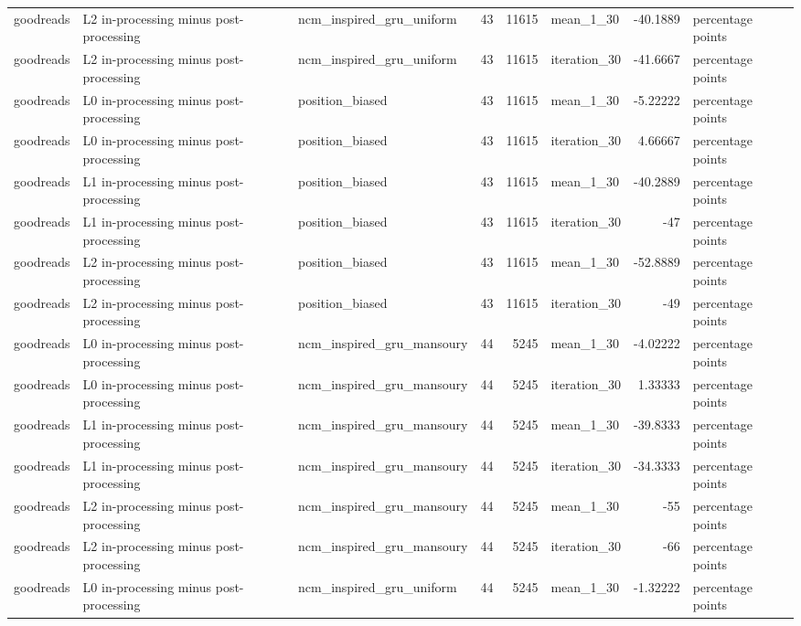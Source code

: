 \begin{table}[htbp!]
\begin{tabular}{lllrrlrl}
goodreads & L2 in-processing minus post-processing & ncm\_inspired\_gru\_uniform & 43 & 11615 & mean\_1\_30 & -40.1889 & percentage points \\
goodreads & L2 in-processing minus post-processing & ncm\_inspired\_gru\_uniform & 43 & 11615 & iteration\_30 & -41.6667 & percentage points \\
goodreads & L0 in-processing minus post-processing & position\_biased & 43 & 11615 & mean\_1\_30 & -5.22222 & percentage points \\
goodreads & L0 in-processing minus post-processing & position\_biased & 43 & 11615 & iteration\_30 & 4.66667 & percentage points \\
goodreads & L1 in-processing minus post-processing & position\_biased & 43 & 11615 & mean\_1\_30 & -40.2889 & percentage points \\
goodreads & L1 in-processing minus post-processing & position\_biased & 43 & 11615 & iteration\_30 & -47 & percentage points \\
goodreads & L2 in-processing minus post-processing & position\_biased & 43 & 11615 & mean\_1\_30 & -52.8889 & percentage points \\
goodreads & L2 in-processing minus post-processing & position\_biased & 43 & 11615 & iteration\_30 & -49 & percentage points \\
goodreads & L0 in-processing minus post-processing & ncm\_inspired\_gru\_mansoury & 44 & 5245 & mean\_1\_30 & -4.02222 & percentage points \\
goodreads & L0 in-processing minus post-processing & ncm\_inspired\_gru\_mansoury & 44 & 5245 & iteration\_30 & 1.33333 & percentage points \\
goodreads & L1 in-processing minus post-processing & ncm\_inspired\_gru\_mansoury & 44 & 5245 & mean\_1\_30 & -39.8333 & percentage points \\
goodreads & L1 in-processing minus post-processing & ncm\_inspired\_gru\_mansoury & 44 & 5245 & iteration\_30 & -34.3333 & percentage points \\
goodreads & L2 in-processing minus post-processing & ncm\_inspired\_gru\_mansoury & 44 & 5245 & mean\_1\_30 & -55 & percentage points \\
goodreads & L2 in-processing minus post-processing & ncm\_inspired\_gru\_mansoury & 44 & 5245 & iteration\_30 & -66 & percentage points \\
goodreads & L0 in-processing minus post-processing & ncm\_inspired\_gru\_uniform & 44 & 5245 & mean\_1\_30 & -1.32222 & percentage points \\

\end{tabular}
\end{table}
